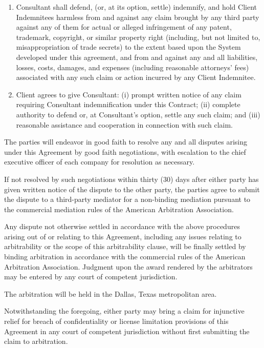 \documentclass{tccontract}
\begin{document}
\begin{body}
\begin{enumerate}
\item Consultant shall defend, (or, at its option, settle) indemnify,
  and hold Client Indemnitees harmless from and against any claim
  brought by any third party against any of them for actual or alleged
  infringement of any patent, trademark, copyright, or similar
  property right (including, but not limited to, misappropriation of
  trade secrets) to the extent based upon the System developed under
  this agreement, and from and against any and all liabilities,
  losses, costs, damages, and expenses (including reasonable
  attorneys' fees) associated with any such claim or action incurred
  by any Client Indemnitee.
  
\item Client agrees to give Consultant: (i) prompt written notice of
  any claim requiring Consultant indemnification under this Contract;
  (ii) complete authority to defend or, at Consultant's option, settle
  any such claim; and (iii) reasonable assistance and cooperation in
  connection with such claim.
\end{enumerate}


The parties will endeavor in good faith to resolve any and all
disputes arising under this Agreement by good faith negotiations, with
escalation to the chief executive officer of each company for
resolution as necessary.  

If not resolved by such negotiations within thirty (30) days after
either party has given written notice of the dispute to the other
party, the parties agree to submit the dispute to a third-party
mediator for a non-binding mediation pursuant to the commercial
mediation rules of the American Arbitration Association.  

Any dispute not otherwise settled in accordance with the above
procedures arising out of or relating to this Agreement, including any
issues relating to arbitrability or the scope of this arbitrability
clause, will be finally settled by binding arbitration in accordance
with the commercial rules of the American Arbitration Association.
Judgment upon the award rendered by the arbitrators may be entered by
any court of competent jurisdiction. 

The arbitration will be held in the Dallas, Texas metropolitan area.

Notwithstanding the foregoing, either party may bring a claim for
injunctive relief for breach of confidentiality or license limitation
provisions of this Agreement in any court of competent jurisdiction
without first submitting the claim to arbitration.



\end{body}
\end{document}
